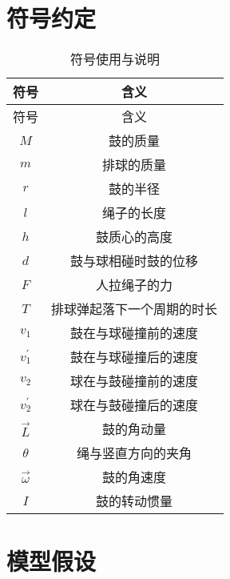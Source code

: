 \documentclass{cumcmthesis}
\begin{document}
\section{符号约定}
\begin{longtable}[c]{cc}
    \caption{符号使用与说明}\label{tab:001}\\
        \toprule[1.5pt] 符号 & 含义\\ \hline \hline \endfirsthead %
        \toprule[1.5pt]  符号 & 含义\\ \hline  \hline \endhead %
        $M$ & 鼓的质量\\
        \hline
        $m$ & 排球的质量\\
        \hline
        $r$ & 鼓的半径\\
        \hline
        $l$ & 绳子的长度\\
        \hline
        $h$ & 鼓质心的高度\\
        \hline
        $d$ & 鼓与球相碰时鼓的位移\\
        \hline
        ${F}$ & 人拉绳子的力\\
        \hline
        $T$ & 排球弹起落下一个周期的时长\\
        \hline
        $v_1$ & 鼓在与球碰撞前的速度\\
        \hline
        $v_1^{'}$ & 鼓在与球碰撞后的速度\\
        \hline
        $v_2$ & 球在与鼓碰撞前的速度\\
        \hline
        $v_2^{'}$ & 球在与鼓碰撞后的速度\\
        \hline
        $\overrightarrow{L}$ & 鼓的角动量\\
        \hline
        $\theta$ & 绳与竖直方向的夹角\\
        \hline
        $\overrightarrow{\omega}$ & 鼓的角速度\\
        \hline
        $I$ & 鼓的转动惯量\\
        \bottomrule[1.5pt]
\end{longtable}

\section{模型假设}
\end{document}

